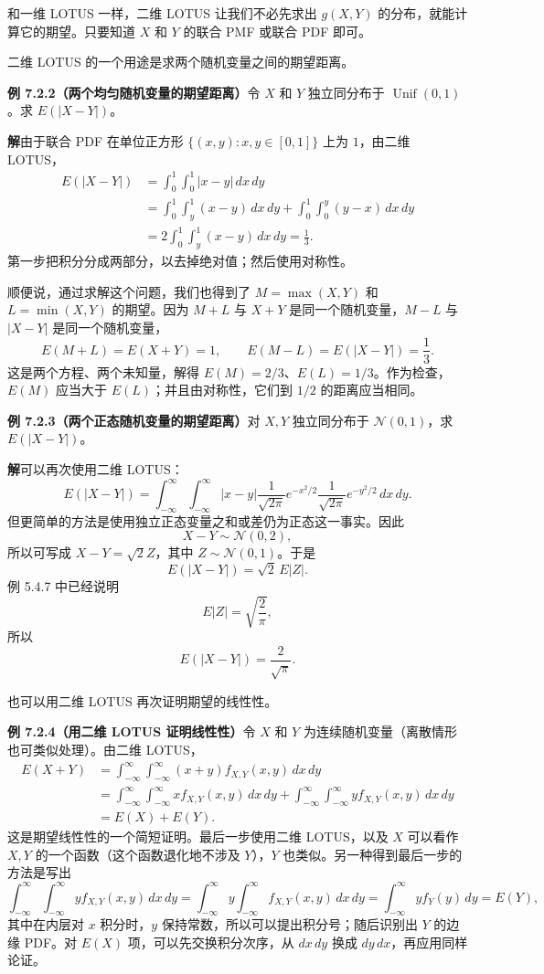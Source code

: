 \documentclass[UTF8, 12pt, fontset=fandol, oneside]{ctexart}
\begin{document}
和一维 LOTUS 一样，二维 LOTUS 让我们不必先求出 $g(X,Y)$ 的分布，就能计算它的期望。只要知道 $X$ 和 $Y$ 的联合 PMF 或联合 PDF 即可。

二维 LOTUS 的一个用途是求两个随机变量之间的期望距离。

\noindent\textbf{例 7.2.2（两个均匀随机变量的期望距离）}\quad 令 $X$ 和 $Y$ 独立同分布于 $\operatorname{Unif}(0,1)$。求 $E(|X-Y|)$。

\noindent\textbf{解}\quad 由于联合 PDF 在单位正方形 $\{(x,y):x,y\in[0,1]\}$ 上为 $1$，由二维 LOTUS，
\[
\begin{aligned}
  E(|X-Y|)
  &=\int_0^1\int_0^1 |x-y|\,dx\,dy\\
  &=\int_0^1\int_y^1 (x-y)\,dx\,dy
    +\int_0^1\int_0^y (y-x)\,dx\,dy\\
  &=2\int_0^1\int_y^1 (x-y)\,dx\,dy=\frac{1}{3}.
\end{aligned}
\]
第一步把积分分成两部分，以去掉绝对值；然后使用对称性。

顺便说，通过求解这个问题，我们也得到了 $M=\max(X,Y)$ 和 $L=\min(X,Y)$ 的期望。因为 $M+L$ 与 $X+Y$ 是同一个随机变量，$M-L$ 与 $|X-Y|$ 是同一个随机变量，
\[
  E(M+L)=E(X+Y)=1,\qquad
  E(M-L)=E(|X-Y|)=\frac{1}{3}.
\]
这是两个方程、两个未知量，解得 $E(M)=2/3$、$E(L)=1/3$。作为检查，$E(M)$ 应当大于 $E(L)$；并且由对称性，它们到 $1/2$ 的距离应当相同。

\noindent\textbf{例 7.2.3（两个正态随机变量的期望距离）}\quad 对 $X,Y$ 独立同分布于 $\mathcal{N}(0,1)$，求 $E(|X-Y|)$。

\noindent\textbf{解}\quad 可以再次使用二维 LOTUS：
\[
  E(|X-Y|)=\int_{-\infty}^{\infty}\int_{-\infty}^{\infty}
  |x-y|\frac{1}{\sqrt{2\pi}}e^{-x^2/2}
  \frac{1}{\sqrt{2\pi}}e^{-y^2/2}\,dx\,dy.
\]
但更简单的方法是使用独立正态变量之和或差仍为正态这一事实。因此
\[
  X-Y\sim \mathcal{N}(0,2),
\]
所以可写成 $X-Y=\sqrt{2}Z$，其中 $Z\sim \mathcal{N}(0,1)$。于是
\[
  E(|X-Y|)=\sqrt{2}\,E|Z|.
\]
例 5.4.7 中已经说明
\[
  E|Z|=\sqrt{\frac{2}{\pi}},
\]
所以
\[
  E(|X-Y|)=\frac{2}{\sqrt{\pi}}.
\]

也可以用二维 LOTUS 再次证明期望的线性性。

\noindent\textbf{例 7.2.4（用二维 LOTUS 证明线性性）}\quad 令 $X$ 和 $Y$ 为连续随机变量（离散情形也可类似处理）。由二维 LOTUS，
\[
\begin{aligned}
  E(X+Y)
  &=\int_{-\infty}^{\infty}\int_{-\infty}^{\infty}
  (x+y)f_{X,Y}(x,y)\,dx\,dy\\
  &=\int_{-\infty}^{\infty}\int_{-\infty}^{\infty}
  x f_{X,Y}(x,y)\,dx\,dy
  +\int_{-\infty}^{\infty}\int_{-\infty}^{\infty}
  y f_{X,Y}(x,y)\,dx\,dy\\
  &=E(X)+E(Y).
\end{aligned}
\]
这是期望线性性的一个简短证明。最后一步使用二维 LOTUS，以及 $X$ 可以看作 $X,Y$ 的一个函数（这个函数退化地不涉及 $Y$），$Y$ 也类似。另一种得到最后一步的方法是写出
\[
  \int_{-\infty}^{\infty}\int_{-\infty}^{\infty}y f_{X,Y}(x,y)\,dx\,dy
  =\int_{-\infty}^{\infty}y\int_{-\infty}^{\infty}f_{X,Y}(x,y)\,dx\,dy
  =\int_{-\infty}^{\infty}y f_Y(y)\,dy=E(Y),
\]
其中在内层对 $x$ 积分时，$y$ 保持常数，所以可以提出积分号；随后识别出 $Y$ 的边缘 PDF。对 $E(X)$ 项，可以先交换积分次序，从 $dx\,dy$ 换成 $dy\,dx$，再应用同样论证。
\end{document}

